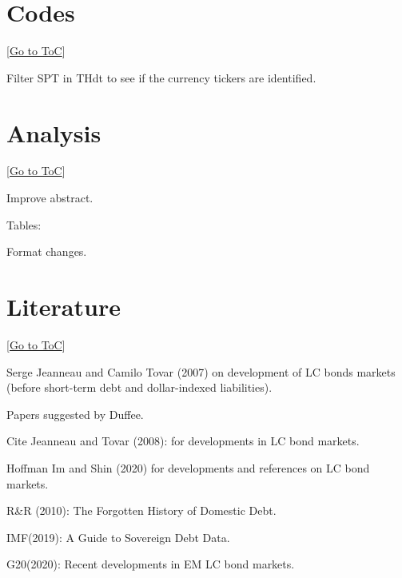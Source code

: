 \documentclass[12pt]{article}
\newcommand{\gototoc}{\vspace{-1.8cm} \null\hfill [\hyperlink{toc}{Go to ToC}] \newline}
\newcommand{\cmark}{\ding{51}}
\newcommand{\done}{\rlap{$\square$}{\raisebox{2pt}{\large\hspace{1pt}\cmark}}%
	\hspace{-2.5pt}}
\begin{document}
\section{Codes}
\gototoc
\begin{todolist}
	\item[\done] Filter SPT in THdt to see if the currency tickers are identified.
\end{todolist}

\section{Analysis}
\gototoc
\begin{todolist}
	\item[\done] Improve abstract.
	\item Tables:
	\begin{todolist}
		\item Format changes.
	\end{todolist}
\end{todolist}

\section{Literature}
\gototoc
\begin{todolist}
	\item Serge Jeanneau and Camilo Tovar (2007) on development of LC bonds markets (before short-term debt and dollar-indexed liabilities).
	\item Papers suggested by Duffee.
	\item Cite Jeanneau and Tovar (2008): for developments in LC bond markets.
	\item Hoffman Im and Shin (2020) for developments and references on LC bond markets.
	\item R\&R (2010): The Forgotten History of Domestic Debt.
	\item IMF(2019): A Guide to Sovereign Debt Data.
	\item G20(2020): Recent developments in EM LC bond markets.
\end{todolist}
\end{document}
